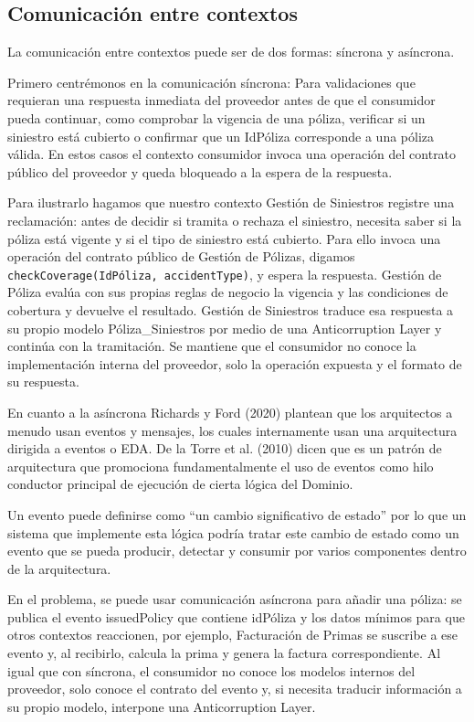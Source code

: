 \documentclass[12pt, a4paper]{article}
\begin{document}
        \subsection{Comunicación entre contextos}

        La comunicación entre contextos puede ser de dos formas: síncrona y asíncrona.

        Primero centrémonos en la comunicación síncrona: Para validaciones que requieran una respuesta inmediata del proveedor antes de que el consumidor pueda continuar, como comprobar la vigencia de una póliza, verificar si un siniestro está cubierto o confirmar que un IdPóliza corresponde a una póliza válida. En estos casos el contexto consumidor invoca una operación del contrato público del proveedor y queda bloqueado a la espera de la respuesta. 
        
        Para ilustrarlo hagamos que nuestro contexto Gestión de Siniestros registre una reclamación: antes de decidir si tramita o rechaza el siniestro, necesita saber si la póliza está vigente y si el tipo de siniestro está cubierto. Para ello invoca una operación del contrato público de Gestión de Pólizas, digamos \texttt{checkCoverage(IdPóliza, accidentType)}, y espera la respuesta. Gestión de Póliza evalúa con sus propias reglas de negocio la vigencia y las condiciones de cobertura y devuelve el resultado. Gestión de Siniestros traduce esa respuesta a su propio modelo Póliza\_Siniestros por medio de una Anticorruption Layer y continúa con la tramitación. Se mantiene que el consumidor no conoce la implementación interna del proveedor, solo la operación expuesta y el formato de su respuesta.

        En cuanto a la asíncrona Richards y Ford (2020) plantean que los arquitectos a menudo usan eventos y mensajes, los cuales internamente usan una arquitectura dirigida a eventos o EDA. De la Torre et al. (2010) dicen que es un patrón de arquitectura que promociona fundamentalmente el uso de eventos como hilo conductor principal de ejecución de cierta lógica del Dominio.

        Un evento puede definirse como ``un cambio significativo de estado'' por lo que un sistema que implemente esta lógica podría tratar este cambio de estado como un evento que se pueda producir, detectar y consumir por varios componentes dentro de la arquitectura.

        En el problema, se puede usar comunicación asíncrona para añadir una póliza: se publica el evento issuedPolicy que contiene idPóliza y los datos mínimos para que otros contextos reaccionen, por ejemplo, Facturación de Primas se suscribe a ese evento y, al recibirlo, calcula la prima y genera la factura correspondiente. Al igual que con síncrona, el consumidor no conoce los modelos internos del proveedor, solo conoce el contrato del evento y, si necesita traducir información a su propio modelo, interpone una Anticorruption Layer.
\end{document}
